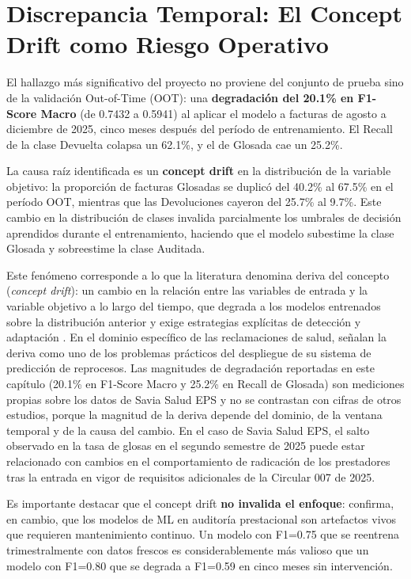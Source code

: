 \documentclass[12pt,letterpaper]{report}
\begin{document}
\section{Discrepancia Temporal: El Concept Drift como Riesgo Operativo}

El hallazgo más significativo del proyecto no proviene del conjunto de prueba sino de la validación Out-of-Time (OOT): una \textbf{degradación del 20.1\% en F1-Score Macro} (de 0.7432 a 0.5941) al aplicar el modelo a facturas de agosto a diciembre de 2025, cinco meses después del período de entrenamiento. El Recall de la clase Devuelta colapsa un 62.1\%, y el de Glosada cae un 25.2\%.

La causa raíz identificada es un \textbf{concept drift} en la distribución de la variable objetivo: la proporción de facturas Glosadas se duplicó del 40.2\% al 67.5\% en el período OOT, mientras que las Devoluciones cayeron del 25.7\% al 9.7\%. Este cambio en la distribución de clases invalida parcialmente los umbrales de decisión aprendidos durante el entrenamiento, haciendo que el modelo subestime la clase Glosada y sobreestime la clase Auditada.

Este fenómeno corresponde a lo que la literatura denomina deriva del concepto (\textit{concept drift}): un cambio en la relación entre las variables de entrada y la variable objetivo a lo largo del tiempo, que degrada a los modelos entrenados sobre la distribución anterior y exige estrategias explícitas de detección y adaptación \cite{gama2014survey, lu2019drift}. En el dominio específico de las reclamaciones de salud, \cite{kumar2010claims} señalan la deriva como uno de los problemas prácticos del despliegue de su sistema de predicción de reprocesos. Las magnitudes de degradación reportadas en este capítulo (20.1\% en F1-Score Macro y 25.2\% en Recall de Glosada) son mediciones propias sobre los datos de Savia Salud EPS y no se contrastan con cifras de otros estudios, porque la magnitud de la deriva depende del dominio, de la ventana temporal y de la causa del cambio. En el caso de Savia Salud EPS, el salto observado en la tasa de glosas en el segundo semestre de 2025 puede estar relacionado con cambios en el comportamiento de radicación de los prestadores tras la entrada en vigor de requisitos adicionales de la Circular 007 de 2025.

Es importante destacar que el concept drift \textbf{no invalida el enfoque}: confirma, en cambio, que los modelos de ML en auditoría prestacional son artefactos vivos que requieren mantenimiento continuo. Un modelo con F1=0.75 que se reentrena trimestralmente con datos frescos es considerablemente más valioso que un modelo con F1=0.80 que se degrada a F1=0.59 en cinco meses sin intervención.
\end{document}
